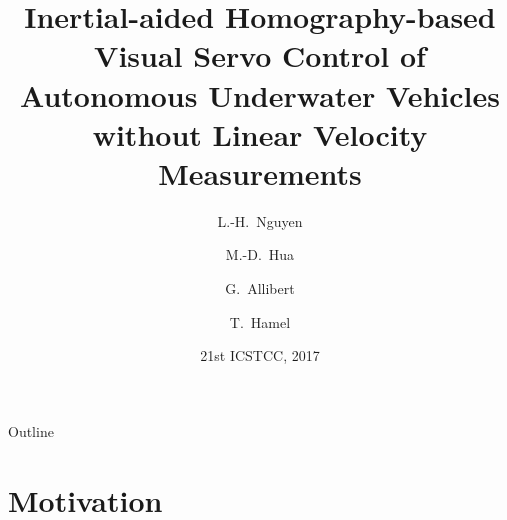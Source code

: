 \documentclass{beamer}
\title[Short Paper Title] %
{Inertial-aided Homography-based Visual Servo Control of Autonomous Underwater Vehicles without Linear Velocity Measurements}
\author[Author, Another] %
{L.-H.~Nguyen \and M.-D.~Hua \and G.~Allibert \and T.~Hamel}
\institute[Universities of Somewhere and Elsewhere] %
{
	\textit{Universit\'e C\^ote d'Azur, CNRS, I3S}\\
	Sophia Antipolis, France \\
	lhnguyen(hua,allibert,thamel)@i3s.unice.fr}
\date[ICSTCC 2017] %
{21st ICSTCC, 2017}
\begin{document}
\begin{frame}
  \titlepage
\end{frame}

\begin{frame}{Outline}
  \tableofcontents
\end{frame}





\section{Motivation}

\end{document}
